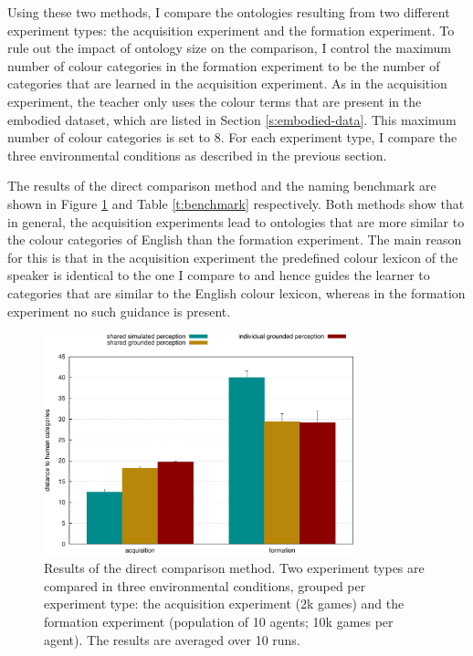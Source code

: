 Using these two methods, I compare the ontologies resulting from two
different experiment types: the acquisition experiment and the
formation experiment. To rule out the impact of ontology size on the
comparison, I control the maximum number of colour categories in the
formation experiment to be the number of categories that are learned
in the acquisition experiment. As in the acquisition experiment, the
teacher only uses the colour terms that are present in the embodied
dataset, which are listed in Section \ref{s:embodied-data}. This
maximum number of colour categories is set to 8. For each experiment
type, I compare the three environmental conditions as described in the
previous section.

The results of the direct comparison method and the naming benchmark
are shown in Figure \ref{f:comparison-distance-to-human-categories}
and Table \ref{t:benchmark} respectively. Both methods show that in
general, the acquisition experiments lead to ontologies that are more
similar to the colour categories of English than the formation
experiment. The main reason for this is that in the acquisition
experiment the predefined colour lexicon of the speaker is identical
to the one I compare to and hence guides the learner to categories
that are similar to the English colour lexicon, whereas in the
formation experiment no such guidance is present.

\begin{figure}[htbp]
\begin{center}
  \includegraphics[width=0.8\textwidth]{./experiments/figures/grounding-comparison-distance-to-human-categories.pdf}
  \caption[Direct comparison between formed grounded colour category
  systems and the English colour categories]{Results of the direct
    comparison method. Two experiment types are compared in three
    environmental conditions, grouped per experiment type: the
    acquisition experiment (2k games) and the formation experiment
    (population of 10 agents; 10k games per agent). The results are
    averaged over 10 runs.}
\label{f:comparison-distance-to-human-categories}
\end{center}
\end{figure}

